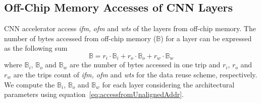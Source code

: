 \documentclass[a4paper,10pt]{article}
\newcommand{\numBytesOffChip}{\mathbb{B}}
\begin{document}
\subsection{Off-Chip Memory Accesses of CNN Layers}
CNN accelerator access \textit{ifm}, \textit{ofm} and \textit{wts} of the layers from off-chip memory. The number of bytes accessed from off-chip memory ($\numBytesOffChip$) for a layer can be expressed as the following sum
\begin{equation}\label{eq:TotalOffChipAccess}
	\numBytesOffChip{}={}{r_{i}}{\cdot}\numBytesOffChip_{i}{+}{r_{o}}{\cdot}\numBytesOffChip_{o}{+}{r_{w}}{\cdot}\numBytesOffChip_{w}
\end{equation}
where $\numBytesOffChip_{i}$, $\numBytesOffChip_{o}$ and $\numBytesOffChip_{w}$ are the number of bytes accessed in one trip and $r_{i}$, $r_{o}$ and $r_{w}$ are the trips count of \textit{ifm, ofm} and \textit{wts} for the data reuse scheme, respectively. We compute the $\numBytesOffChip_{i}$, $\numBytesOffChip_{o}$ and $\numBytesOffChip_{w}$ for each layer considering the architectural parameters using equation~\ref{eq:accessfromUnalignedAddr}.
\end{document}
